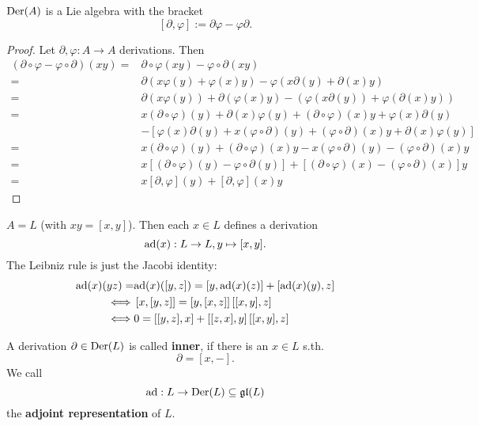 \begin{proposition}
    $\text{Der}(A)$ is a Lie algebra with the bracket
    $$ [\partial, \varphi] := \partial \varphi - \varphi \partial .$$ 
\end{proposition}
\begin{proof}
    Let $\partial, \varphi : A \to A$ derivations. 
    Then
    \newcommand{\p}{\partial}
    \newcommand{\f}{\varphi}
    \begin{align*}   
        (\p \circ \f - \f \circ \p)(xy) =& \p \circ \f(xy) - \f \circ \p(xy)\\
        =& \p(x \f(y) + \f(x)y) - \f(x\p(y) + \p(x)y)\\
        =& \p(x\f(y)) + \p(\f(x)y) - (\f(x\p(y)) + \f(\p(x)y))\\
        =& x (\p \circ \f)(y) + \p(x)\f(y) + (\p \circ \f)(x)y + \f(x)\p(y) \\
        & - \left[\f(x)\p(y) + x(\f \circ\p)(y) + (\f\circ\p)(x)y + \p(x)\f(y)\right] \\
        =& x(\p \circ \f)(y) + (\p \circ \f)(x)y - x (\f\circ\p)(y) - (\f\circ\p)(x)y\\
        =&x\left[(\p \circ \f)(y) - \f\circ\p(y)\right] + \left[(\p\circ\f)(x) - (\f\circ\p)(x)\right]y\\
        =&x[\p,\f](y) + [\p,\f](x)y
    \end{align*}
\end{proof}

\begin{example}
    $A=L$ (with $xy=[x,y]$). Then each $x \in L$ defines a derivation 
    $$\text{ad}(x): L \to L, y \mapsto [x,y].$$
    The Leibniz rule is just the Jacobi identity:
    \begin{align*}
        \text{ad}(x)(yz) =& \text{ad}(x)([y,z]) = [y, \text{ad}(x)(z)] + [\text{ad}(x)(y),z]\\
        \iff& \left[x,[y,z]\right] = \left[y,[x,z]\right] \left[[x,y],z\right] \\
        \iff& 0 = \left[[y,z],x\right] + \left[[z,x],y\right] \left[[x,y],z\right]
    \end{align*}
\end{example}

\begin{definition}
    A derivation $\partial \in \text{Der}(L)$ is called \textbf{inner}, 
    if there is an $x \in L$ s.th.
    $$\partial = [x,-].$$
    We call 
    $$ \text{ad} : L \to \text{Der}(L) \subseteq \mathfrak{gl}(L)$$
    the \textbf{adjoint representation} of $L$.
\end{definition}

